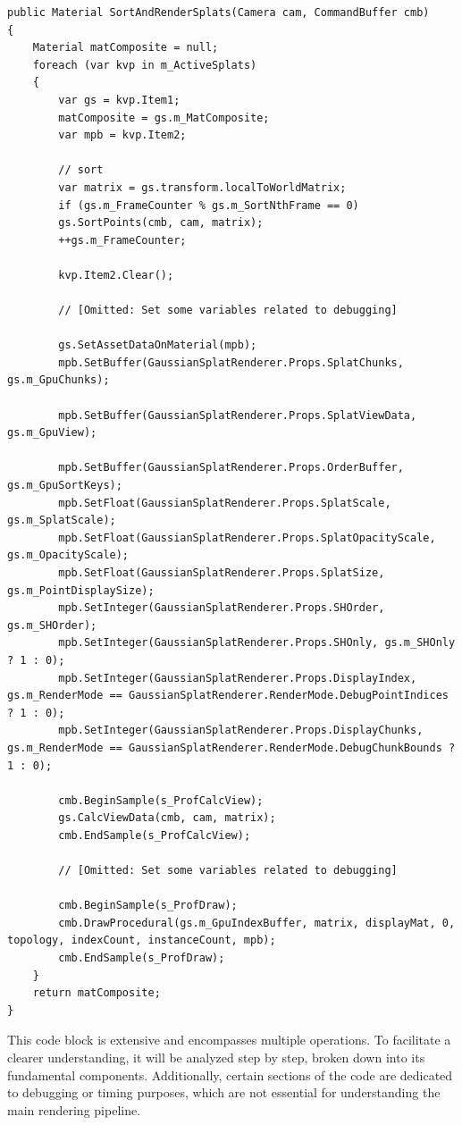 \documentclass[12pt]{article}
\begin{document}
\begin{lstlisting}[tabsize=2,caption=\texttt{SortAndRenderSplats} of \texttt{GaussianSplatRenderSystem}, label=code:systemsortrender,breaklines=true,breakatwhitespace=true,basicstyle=\ttfamily\footnotesize]
public Material SortAndRenderSplats(Camera cam, CommandBuffer cmb)
{
	Material matComposite = null;
	foreach (var kvp in m_ActiveSplats)
	{
		var gs = kvp.Item1;
		matComposite = gs.m_MatComposite;
		var mpb = kvp.Item2;
		
		// sort
		var matrix = gs.transform.localToWorldMatrix;
		if (gs.m_FrameCounter % gs.m_SortNthFrame == 0)
		gs.SortPoints(cmb, cam, matrix);
		++gs.m_FrameCounter;
		
		kvp.Item2.Clear();
		
		// [Omitted: Set some variables related to debugging]
		
		gs.SetAssetDataOnMaterial(mpb);
		mpb.SetBuffer(GaussianSplatRenderer.Props.SplatChunks, gs.m_GpuChunks);
		
		mpb.SetBuffer(GaussianSplatRenderer.Props.SplatViewData, gs.m_GpuView);
		
		mpb.SetBuffer(GaussianSplatRenderer.Props.OrderBuffer, gs.m_GpuSortKeys);
		mpb.SetFloat(GaussianSplatRenderer.Props.SplatScale, gs.m_SplatScale);
		mpb.SetFloat(GaussianSplatRenderer.Props.SplatOpacityScale, gs.m_OpacityScale);
		mpb.SetFloat(GaussianSplatRenderer.Props.SplatSize, gs.m_PointDisplaySize);
		mpb.SetInteger(GaussianSplatRenderer.Props.SHOrder, gs.m_SHOrder);
		mpb.SetInteger(GaussianSplatRenderer.Props.SHOnly, gs.m_SHOnly ? 1 : 0);
		mpb.SetInteger(GaussianSplatRenderer.Props.DisplayIndex, gs.m_RenderMode == GaussianSplatRenderer.RenderMode.DebugPointIndices ? 1 : 0);
		mpb.SetInteger(GaussianSplatRenderer.Props.DisplayChunks, gs.m_RenderMode == GaussianSplatRenderer.RenderMode.DebugChunkBounds ? 1 : 0);
		
		cmb.BeginSample(s_ProfCalcView);
		gs.CalcViewData(cmb, cam, matrix);
		cmb.EndSample(s_ProfCalcView);
		
		// [Omitted: Set some variables related to debugging]
		
		cmb.BeginSample(s_ProfDraw);
		cmb.DrawProcedural(gs.m_GpuIndexBuffer, matrix, displayMat, 0, topology, indexCount, instanceCount, mpb);
		cmb.EndSample(s_ProfDraw);
	}
	return matComposite;
}
\end{lstlisting}
This code block is extensive and encompasses multiple operations. To facilitate a clearer understanding, it will be analyzed step by step, broken down into its fundamental components. Additionally, certain sections of the code are dedicated to debugging or timing purposes, which are not essential for understanding the main rendering pipeline.\\\\
\end{document}
